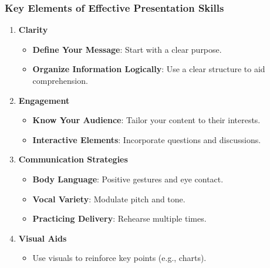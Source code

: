 \documentclass[aspectratio=169]{beamer}
\begin{document}
\begin{frame}[fragile]
    \frametitle{Key Elements of Effective Presentation Skills}
    \begin{enumerate}
        \item \textbf{Clarity}
        \begin{itemize}
            \item \textbf{Define Your Message}: Start with a clear purpose. 
            \item \textbf{Organize Information Logically}: Use a clear structure to aid comprehension.
        \end{itemize}
        
        \item \textbf{Engagement}
        \begin{itemize}
            \item \textbf{Know Your Audience}: Tailor your content to their interests.
            \item \textbf{Interactive Elements}: Incorporate questions and discussions.
        \end{itemize}
        
        \item \textbf{Communication Strategies}
        \begin{itemize}
            \item \textbf{Body Language}: Positive gestures and eye contact.
            \item \textbf{Vocal Variety}: Modulate pitch and tone.
            \item \textbf{Practicing Delivery}: Rehearse multiple times.
        \end{itemize}
        
        \item \textbf{Visual Aids}
        \begin{itemize}
            \item Use visuals to reinforce key points (e.g., charts).
        \end{itemize}
    \end{enumerate}
\end{frame}
\end{document}
